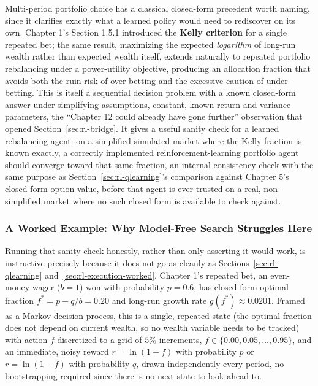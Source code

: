 \documentclass[../ai_in_finance]{subfiles}
\begin{document}
Multi-period portfolio choice has a classical closed-form precedent worth naming, since it clarifies exactly what a learned policy would need to rediscover on its own. Chapter 1's Section 1.5.1 introduced the \textbf{Kelly criterion} for a single repeated bet; the same result, maximizing the expected \emph{logarithm} of long-run wealth rather than expected wealth itself, extends naturally to repeated portfolio rebalancing under a power-utility objective, producing an allocation fraction that avoids both the ruin risk of over-betting and the excessive caution of under-betting. This is itself a sequential decision problem with a known closed-form answer under simplifying assumptions, constant, known return and variance parameters, the ``Chapter 12 could already have gone further'' observation that opened Section~\ref{sec:rl-bridge}. It gives a useful sanity check for a learned rebalancing agent: on a simplified simulated market where the Kelly fraction is known exactly, a correctly implemented reinforcement-learning portfolio agent should converge toward that same fraction, an internal-consistency check with the same purpose as Section~\ref{sec:rl-qlearning}'s comparison against Chapter 5's closed-form option value, before that agent is ever trusted on a real, non-simplified market where no such closed form is available to check against.

\subsubsection*{A Worked Example: Why Model-Free Search Struggles Here}
\label{sec:rl-kelly-worked}

Running that sanity check honestly, rather than only asserting it would work, is instructive precisely because it does not go as cleanly as Sections~\ref{sec:rl-qlearning} and~\ref{sec:rl-execution-worked}. Chapter 1's repeated bet, an even-money wager ($b=1$) won with probability $p=0.6$, has closed-form optimal fraction $f^*=p-q/b=0.20$ and long-run growth rate $g(f^*)\approx0.0201$. Framed as a Markov decision process, this is a single, repeated state (the optimal fraction does not depend on current wealth, so no wealth variable needs to be tracked) with action $f$ discretized to a grid of $5\%$ increments, $f\in\{0.00,0.05,\ldots,0.95\}$, and an immediate, noisy reward $r=\ln(1+f)$ with probability $p$ or $r=\ln(1-f)$ with probability $q$, drawn independently every period, no bootstrapping required since there is no next state to look ahead to.
\end{document}

